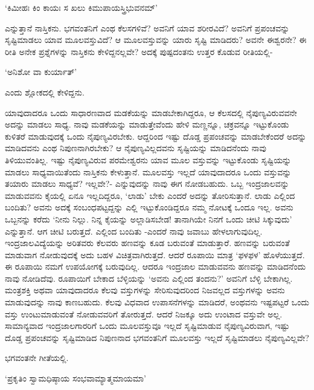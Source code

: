 \begin{shloka}
`ಕಿಮೀಹಃ ಕಿಂ ಕಾಯಃ ಸ ಖಲು ಕಿಮುಪಾಯಸ್ತ್ರಿಭುವನಮ್'
\end{shloka}

ಎನ್ನುತ್ತಾನೆ ನಾಸ್ತಿಕನು. ಭಗವಂತನಿಗೆ ಎಂಥ ಕೆಲಸಗಳಿವೆ? ಅವನಿಗೆ ಯಾವ ಶರೀರವಿದೆ? ಅವನಿಗೆ ಪ್ರಪಂಚವನ್ನು ಸೃಷ್ಟಿಮಾಡಲು ಯಾವ ಮೂಲವಸ್ತುವಿದೆ? ಆ ಮೂಲವಸ್ತುವನ್ನು ಯಾರು ಸೃಷ್ಟಿ ಮಾಡಿದರು? ಅವನೇ ಈಶ್ವರನೇ? ಈ ರೀತಿ ಅನೇಕ ಪ್ರಶ್ನೆಗಳನ್ನು ನಾಸ್ತಿಕನು ಕೇಳಿದ್ದನಲ್ಲವೇ? ಅದಕ್ಕೆ ಪುಷ್ಪದಂತನು ಉತ್ತರ ಕೊಡುವ ರೀತಿಯಲ್ಲಿ-

\begin{shloka}
`ಅನಿಶೋ ವಾ ಕುರ್ಯಾತ್'
\end{shloka}

ಎಂದು ಶ್ಲೋಕದಲ್ಲಿ ಕೇಳಿದ್ದನು.

ಯಾವುದಾದರೂ ಒಂದು ಸಾಧಾರಣವಾದ ಮಡಕೆಯನ್ನು ಮಾಡಬೇಕಾಗಿದ್ದರೂ, ಆ ಕೆಲಸದಲ್ಲಿ ನೈಪುಣ್ಯವಿರುವವನೇ ಅದನ್ನು ಮಾಡಲು ಸಾಧ್ಯ. ನಾವು ಮಡಕೆಯನ್ನು ಮಾಡುತ್ತೇವೆಂದು ಹೇಳಿ ಮಣ್ಣನ್ನೂ, ಚಕ್ರವನ್ನೂ ಇಟ್ಟುಕೊಂಡು ಕುಳಿತರೆ ಮಾಡುವುದಕ್ಕೆ ಒಂದು ನೈಪುಣ್ಯವಿರಬೇಕು. ಆದ್ದರಿಂದ ಇಷ್ಟು ದೊಡ್ಡ ಪ್ರಪಂಚವನ್ನು ಮಾಡಬೇಕೆಂದರೆ ಅದನ್ನು ಮಾಡಿದವನು ಎಂಥ ನಿಪುಣನಾಗಿರಬೇಕು? ಆ ನೈಪುಣ್ಯವಿಲ್ಲದವನು ಸೃಷ್ಟಿಯನ್ನು ಮಾಡಿದನೆಂದು ನಾವು ತಿಳಿಯುವಂತಿಲ್ಲ. ಇಷ್ಟು ನೈಪುಣ್ಯವಿರುವ ಪರಮೇಶ್ವರನು ಯಾವ ಮೂಲ ವಸ್ತುವನ್ನು ಇಟ್ಟುಕೊಂಡು ಸೃಷ್ಟಿಯನ್ನು ಮಾಡಲು ಸಾಧ್ಯವಾಯಿತೆಂದು ನಾಸ್ತಿಕನು ಕೇಳುತ್ತಾನೆ. ಮೂಲವಸ್ತು ಇಲ್ಲದೆ ಯಾವುದಾದರೂ ಒಂದು ವಸ್ತುವನ್ನು ತಯಾರು ಮಾಡಲು ಸಾಧ್ಯವೆ? ಇಲ್ಲವೇ?- ಎನ್ನುವುದನ್ನು ನಾವು ಈಗ ನೋಡಬಹುದು. ಒಬ್ಬ ಇಂದ್ರಜಾಲವನ್ನು ಮಾಡುವವನು ಕೈಯಲ್ಲಿ ಏನೂ ಇಲ್ಲದಿದ್ದರೂ, `ಲಾಡು' ಬೇಕು ಎಂದರೆ ಅದನ್ನು ತೋರಿಸುತ್ತಾನೆ. ಲಾಡು ಎಲ್ಲಿಂದ ಬಂದಿತು? ಅವನು ಅದಕ್ಕೆ ಸಂಬಂಧಪಟ್ಟದ್ದನ್ನು ಎಲ್ಲಿ ಇಟ್ಟುಕೊಂಡಿದ್ದರೂ ನಮ್ಮ ನೋಟಕ್ಕೆ ಒಂದೂ ಇಲ್ಲ. ಅವನು ಒಬ್ಬನನ್ನು ಕರೆದು `ನೀನು ನಿಲ್ಲು. ನಿನ್ನ ಕೈಯನ್ನು ಅಲ್ಲಾಡಿಸಬೇಡ! ತಾನಾಗಿಯೇ ನಿನಗೆ ಒಂದು ಚೀಟಿ ಸಿಕ್ಕುವುದು' ಎನ್ನುತ್ತಾನೆ. ಆಗ ಚೀಟಿ ಬರುತ್ತದೆ. ಎಲ್ಲಿಂದ ಬಂದಿತು -ಎಂದರೆ ನಾವು ಜವಾಬು ಹೇಳಲಾಗುವುದಿಲ್ಲ. ಇಂದ್ರಜಾಲವಿದ್ಯೆಯನ್ನು ಅರಿತವರು ಕೆಲವರು ಹಣವನ್ನು ಕೂಡ ಬರುವಂತೆ ಮಾಡುತ್ತಾರೆ. ಹಣವನ್ನು ಬರುವಂತೆ ಮಾಡುವಾಗ ನೋಡುವುದಕ್ಕೆ ಅದು ಬಹಳ ವಿಚಿತ್ರವಾಗಿರುತ್ತದೆ. ಆದರೆ ರೂಪಾಯಿ ಮಾತ್ರ `ಫಳಫಳ' ಹೊಳೆಯುತ್ತದೆ. ಈ ರೂಪಾಯಿ ನಮಗೆ ಉಪಯೋಗಕ್ಕೆ ಬರುವುದಿಲ್ಲ. ಆದರೂ ಇಂದ್ರಜಾಲ ಮಾಡುವವನು ಹಣವನ್ನು ಮಾಡಿದನೆಂದು ನಾವು ನೋಡಿದೆವು. ರೂಪಾಯಿಗೆ ಬೇಕಾದ ಬೆಳ್ಳಿಯನ್ನು `ಅವನು ಎಲ್ಲಿಂದ ತಂದನು?' ಅವನಿಗೆ ಬೆಳ್ಳಿ ಬೇಕಾಗಿಲ್ಲ. ಮಂತ್ರಶಕ್ತಿ ಅಥವಾ ಯಾವುದಾದರೂ ಕೆಲವು ವಸ್ತುಗಳನ್ನು ಸೇರಿಸುವುದರಿಂದ ನಿಜವಲ್ಲದ ವಸ್ತುಗಳನ್ನು ಅವನು ಮಾಡುವುದನ್ನು ನಾವು ಕಾಣಬಹುದು. ಕೆಲವು ವಿಧವಾದ ಉಪಾಸನೆಗಳನ್ನು ಮಾಡಿದರೆ, ಅಂಥವನು ಇಷ್ಟಪಟ್ಟರೆ ಒಂದು ವಸ್ತು ಉಂಟುಮಾಡುವಂತೆ ನೋಡುವವರಿಗೆ ತೋರುತ್ತದೆ. ಆದರೆ ನಿಜಕ್ಕೂ ಅದು ಉಂಟಾದ ವಸ್ತುವೇ ಅಲ್ಲ. ಸಾಮಾನ್ಯವಾದ ಇಂದ್ರಜಾಲಗಾರರಿಗೆ ಒಂದು ಮೂಲವಸ್ತುವೂ ಇಲ್ಲದೆ ಸೃಷ್ಟಿಮಾಡುವ ನೈಪುಣ್ಯವಿರುವಾಗ, ಇಷ್ಟು ದೊಡ್ಡ ಪ್ರಪಂಚವನ್ನು ಸೃಷ್ಟಿಮಾಡಿದ ನಿಪುಣನಾದ ಭಗವಂತನಿಗೆ ಮೂಲವಸ್ತು ಇಲ್ಲದೆ ಸೃಷ್ಟಿಮಾಡಲು ನೈಪುಣ್ಯವಿಲ್ಲವೇ?

ಭಗವಂತನೇ ಗೀತೆಯಲ್ಲಿ.

\begin{shloka}
`ಪ್ರಕೃತಿಂ ಸ್ವಾಮಧಿಷ್ಠಾಯ ಸಂಭವಾಮ್ಯಾತ್ಮಮಾಯಮಾ'
\end{shloka}

